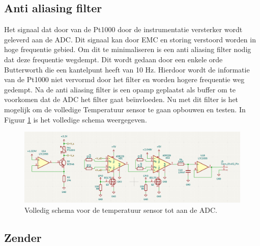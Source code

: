 \subsection{Anti aliasing filter}
Het signaal dat door van de Pt1000 door de instrumentatie versterker wordt geleverd aan de ADC. Dit signaal kan door EMC en storing verstoord worden in hoge frequentie gebied. Om dit te minimaliseren is een anti aliasing filter nodig dat deze frequentie wegdempt. Dit wordt gedaan door een enkele orde Butterworth die een kantelpunt heeft van 10 Hz. Hierdoor wordt de informatie van de Pt1000 niet vervormd door het filter en worden hogere frequentie weg gedempt. Na de anti aliasing filter is een opamp geplaatst als buffer om te voorkomen dat de ADC het filter gaat beïnvloeden. Nu met dit filter is het mogelijk om de volledige Temperatuur sensor te gaan opbouwen en testen. In Figuur \ref{fig:complete_temp_sensor} is het volledige schema weergegeven.
\begin{figure}[H]
    \centering
    \includegraphics[width=1\linewidth]{pictures/Temp_sensor_complete_schematic.png}
    \caption{Volledig schema voor de temperatuur sensor tot aan de ADC.}
    \label{fig:complete_temp_sensor}
\end{figure}




\newpage
\subsection{Zender}